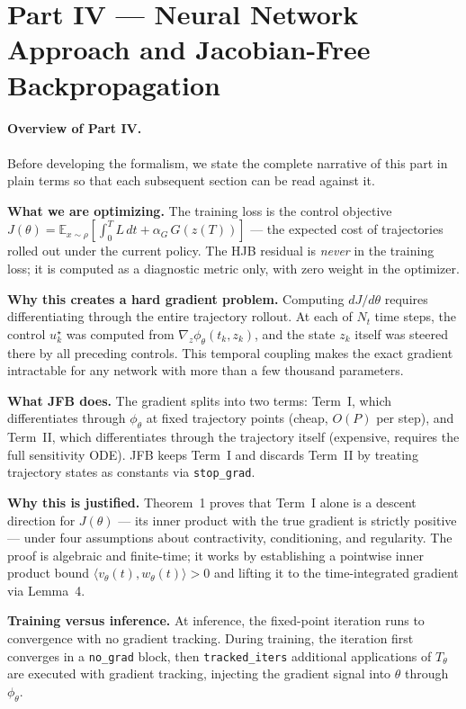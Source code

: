 \documentclass{article}
\begin{document}
\pagebreak

\section{Part IV --- Neural Network Approach and Jacobian-Free Backpropagation}

\paragraph{Overview of Part IV.}
Before developing the formalism, we state the complete narrative of this part
in plain terms so that each subsequent section can be read against it.

\textbf{What we are optimizing.} The training loss is the control objective
$J(\theta) = \mathbb{E}_{x\sim\rho}[\int_0^T L\,dt + \alpha_G\, G(z(T))]$
--- the expected cost of trajectories rolled out under the current policy.
The HJB residual is \emph{never} in the training loss; it is computed as a
diagnostic metric only, with zero weight in the optimizer.

\textbf{Why this creates a hard gradient problem.} Computing $dJ/d\theta$
requires differentiating through the entire trajectory rollout. At each of
$N_t$ time steps, the control $u^\star_k$ was computed from
$\nabla_z\phi_\theta(t_k, z_k)$, and the state $z_k$ itself was steered
there by all preceding controls. This temporal coupling makes the exact
gradient intractable for any network with more than a few thousand parameters.

\textbf{What JFB does.} The gradient splits into two terms: Term~I, which
differentiates through $\phi_\theta$ at fixed trajectory points (cheap,
$O(P)$ per step), and Term~II, which differentiates through the trajectory
itself (expensive, requires the full sensitivity ODE). JFB keeps Term~I and
discards Term~II by treating trajectory states as constants via
\texttt{stop\_grad}.

\textbf{Why this is justified.} Theorem~1 proves that Term~I alone is a
descent direction for $J(\theta)$ --- its inner product with the true
gradient is strictly positive --- under four assumptions about contractivity,
conditioning, and regularity. The proof is algebraic and finite-time; it
works by establishing a pointwise inner product bound
$\langle v_\theta(t), w_\theta(t)\rangle > 0$ and lifting it to the
time-integrated gradient via Lemma~4.

\textbf{Training versus inference.} At inference, the fixed-point iteration
runs to convergence with no gradient tracking. During training, the iteration
first converges in a \texttt{no\_grad} block, then \texttt{tracked\_iters}
additional applications of $T_\theta$ are executed with gradient tracking,
injecting the gradient signal into $\theta$ through $\phi_\theta$.
\end{document}
